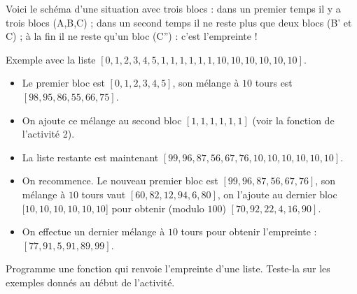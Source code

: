 \documentclass[11pt,class=report,crop=false]{standalone}
\begin{document}
\begin{activite}
\begin{enumerate}
 
Voici le schéma d'une situation avec trois blocs : dans un premier temps il y a trois blocs (A,B,C) ; dans un second temps il ne reste plus que deux blocs (B' et C) ; à la fin il ne reste qu'un bloc (C'') : c'est l'empreinte !
  
  
  Exemple avec la liste $[0,1,2,3,4,5,1,1,1,1,1,1,10,10,10,10,10,10]$.
  \begin{itemize}
    \item Le premier bloc est $[0,1,2,3,4,5]$, son mélange à $10$ tours est 
    $[98, 95, 86, 55, 66, 75]$. 
    \item On ajoute ce mélange au second bloc $[1,1,1,1,1,1]$ (voir la fonction  de l'activité 2).
    \item La liste restante est maintenant $[99,96,87,56,67,76,10,10,10,10,10,10]$.
    \item On recommence. Le nouveau premier bloc est $[99,96,87,56,67,76]$, son mélange à $10$ tours vaut $[60, 82, 12, 94, 6, 80]$, on l'ajoute au dernier bloc $[10,10,10,10,10,10$] pour obtenir (modulo $100$) $[70,92,22,4,16,90]$.
    \item On effectue un dernier mélange à $10$ tours pour obtenir l'empreinte : $[77, 91, 5, 91, 89, 99]$.
   \end{itemize}
   
   Programme une fonction  qui renvoie l'empreinte d'une liste.
     Teste-la sur les exemples donnés au début de l'activité.
\end{enumerate}   
     
\end{activite}



\end{document}

